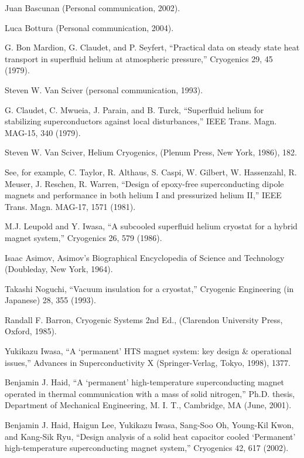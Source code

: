 \noindent [4.19] Juan Bascunan (Personal communication, 2002).

\noindent [4.20] Luca Bottura (Personal communication, 2004).

\noindent [4.21] G. Bon Mardion, G. Claudet, and P. Seyfert, ``Practical data on steady state heat
transport in superfluid helium at atmospheric pressure,” Cryogenics 29, 45 (1979).

\noindent [4.22] Steven W. Van Sciver (personal communication, 1993).

\noindent [4.23] G. Claudet, C. Mwueia, J. Parain, and B. Turck, ``Superfluid helium for stabilizing superconductors against local disturbances,” IEEE Trans. Magn. MAG-15, 340 (1979).

\noindent [4.24] Steven W. Van Sciver, Helium Cryogenics, (Plenum Press, New York, 1986), 182.

\noindent [4.25] See, for example, C. Taylor, R. Althaus, S. Caspi, W. Gilbert, W. Hassenzahl,
R. Meuser, J. Reschen, R. Warren, ``Design of epoxy-free superconducting dipole
magnets and performance in both helium I and pressurized helium II,” IEEE Trans.
Magn. MAG-17, 1571 (1981).

\noindent [4.26] M.J. Leupold and Y. Iwasa, ``A subcooled superfluid helium cryostat for a hybrid
magnet system,” Cryogenics 26, 579 (1986).

\noindent [4.27] Isaac Asimov, Asimov’s Biographical Encyclopedia of Science and Technology
(Doubleday, New York, 1964).

\noindent [4.28] Takashi Noguchi, ``Vacuum insulation for a cryostat,” Cryogenic Engineering (in Japanese) 28, 355 (1993).

\noindent [4.29] Randall F. Barron, Cryogenic Systems 2nd Ed., (Clarendon University Press, Oxford, 1985).

\noindent [4.30] Yukikazu Iwasa, ``A ‘permanent’ HTS magnet system: key design \& operational
issues,” Advances in Superconductivity X (Springer-Verlag, Tokyo, 1998), 1377.

\noindent [4.31] Benjamin J. Haid, ``A ‘permanent’ high-temperature superconducting magnet operated in thermal communication with a mass of solid nitrogen,” Ph.D. thesis,
Department of Mechanical Engineering, M. I. T., Cambridge, MA (June, 2001).

\noindent [4.32] Benjamin J. Haid, Haigun Lee, Yukikazu Iwasa, Sang-Soo Oh, Young-Kil Kwon,
and Kang-Sik Ryu, ``Design analysis of a solid heat capacitor cooled ‘Permanent’
high-temperature superconducting magnet system,” Cryogenics 42, 617 (2002).

